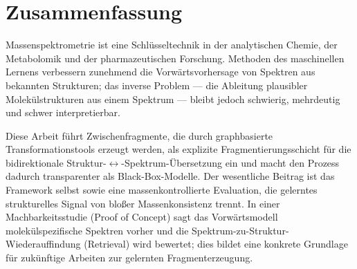 {}
\clearpage
\chapter*{Zusammenfassung}
Massenspektrometrie ist eine Schlüsseltechnik in der analytischen Chemie, der Metabolomik und der pharmazeutischen Forschung. Methoden des maschinellen Lernens verbessern zunehmend die Vorwärtsvorhersage von Spektren aus bekannten Strukturen; das inverse Problem --- die Ableitung plausibler Molekülstrukturen aus einem Spektrum --- bleibt jedoch schwierig, mehrdeutig und schwer interpretierbar.

Diese Arbeit führt Zwischenfragmente, die durch graphbasierte Transformationstools erzeugt werden, als explizite Fragmentierungsschicht für die bidirektionale Struktur-$\leftrightarrow$-Spektrum-Übersetzung ein und macht den Prozess dadurch transparenter als Black-Box-Modelle.
Der wesentliche Beitrag ist das Framework selbst sowie eine massenkontrollierte Evaluation, die gelerntes strukturelles Signal von bloßer Massenkonsistenz trennt.
In einer Machbarkeitsstudie (Proof of Concept) sagt das Vorwärtsmodell molekülspezifische Spektren vorher und die Spektrum-zu-Struktur-Wiederauffindung (Retrieval) wird bewertet; dies bildet eine konkrete Grundlage für zukünftige Arbeiten zur gelernten Fragmenterzeugung.

{}
\listoftables
{}
{}
\listoffigures
{}
{}
